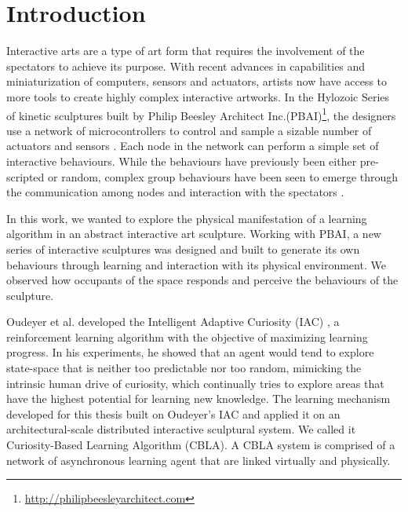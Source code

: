 

\chapter{Introduction} \label{chap:intro}

Interactive arts are a type of art form that requires the involvement of the spectators to achieve its purpose. With recent advances in capabilities and miniaturization of computers, sensors and actuators, artists now have access to more tools to create highly complex interactive artworks. In the Hylozoic Series of kinetic sculptures built by Philip Beesley Architect Inc.(PBAI)\footnote{\url{http://philipbeesleyarchitect.com}}, the designers use a network of microcontrollers to control and sample a sizable number of actuators and sensors \cite{Beesley2010.book} \cite{Beesley2007.book}. Each node in the network can perform a simple set of interactive behaviours. While the behaviours have previously been either pre-scripted or random, complex group behaviours have been seen to emerge through the communication among nodes and interaction with the spectators \cite{Beesley2012.book}. 

In this work, we wanted to explore the physical manifestation of a learning algorithm in an abstract interactive art sculpture. Working with PBAI, a new series of interactive sculptures was designed and built to generate its own behaviours through learning and interaction with its physical environment. We observed how occupants of the space responds and perceive the behaviours of the sculpture. 
 
Oudeyer et al. developed the Intelligent Adaptive Curiosity (IAC) \cite{Oudeyer2007}, a reinforcement learning algorithm with the objective of maximizing learning progress. In his experiments, he showed that an agent would tend to explore state-space that is neither too predictable nor too random, mimicking the intrinsic human drive of curiosity, which continually tries to explore areas that have the highest potential for learning new knowledge. The learning mechanism developed for this thesis built on Oudeyer’s IAC and applied it on an architectural-scale distributed interactive sculptural system. We called it Curiosity-Based Learning Algorithm (CBLA). A CBLA system is comprised of a network of asynchronous learning agent that are linked virtually and physically.  

